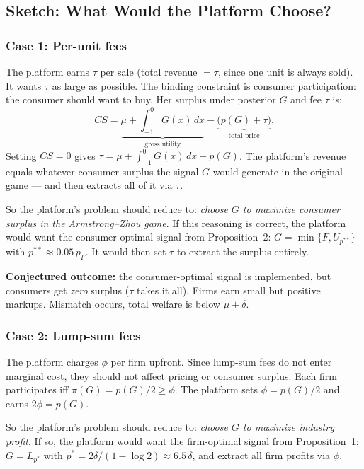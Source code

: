 \documentclass[12pt, a4paper]{article}
\begin{document}
\subsection{Sketch: What Would the Platform Choose?}

\subsubsection{Case 1: Per-unit fees}

The platform earns $\tau$ per sale (total revenue $= \tau$, since one unit is always sold). It wants $\tau$ as large as possible. The binding constraint is consumer participation: the consumer should want to buy. Her surplus under posterior $G$ and fee $\tau$ is:
$$CS = \underbrace{\mu + \int_{-1}^{0} G(x)\,dx}_{\text{gross utility}} - \underbrace{\big(p(G) + \tau\big)}_{\text{total price}}.$$
Setting $CS = 0$ gives $\tau = \mu + \int_{-1}^{0} G(x)\,dx - p(G)$. The platform's revenue equals whatever consumer surplus the signal $G$ would generate in the original game --- and then extracts all of it via $\tau$.

So the platform's problem should reduce to: \emph{choose $G$ to maximize consumer surplus in the Armstrong--Zhou game}. If this reasoning is correct, the platform would want the consumer-optimal signal from Proposition~2: $G = \min\{F, U_{p^{**}}\}$ with $p^{**} \approx 0.05\, p_F$. It would then set $\tau$ to extract the surplus entirely.

\textbf{Conjectured outcome:} the consumer-optimal signal is implemented, but consumers get \emph{zero} surplus ($\tau$ takes it all). Firms earn small but positive markups. Mismatch occurs, total welfare is below $\mu + \delta$.

\subsubsection{Case 2: Lump-sum fees}

The platform charges $\phi$ per firm upfront. Since lump-sum fees do not enter marginal cost, they should not affect pricing or consumer surplus. Each firm participates iff $\pi(G) = p(G)/2 \geq \phi$. The platform sets $\phi = p(G)/2$ and earns $2\phi = p(G)$.

So the platform's problem should reduce to: \emph{choose $G$ to maximize industry profit}. If so, the platform would want the firm-optimal signal from Proposition~1: $G = L_{p^*}$ with $p^* = 2\delta/(1 - \log 2) \approx 6.5\,\delta$, and extract all firm profits via $\phi$.
\end{document}

